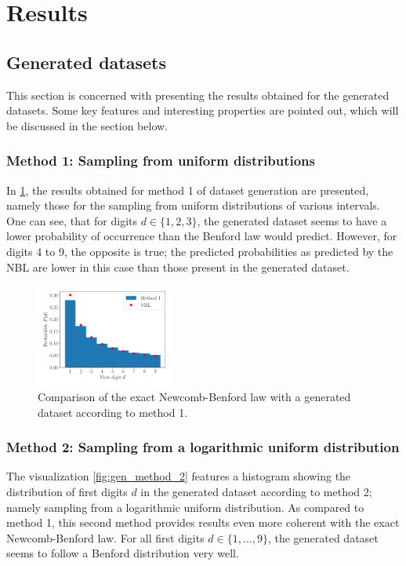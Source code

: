 \documentclass[a4paper,10pt, twocolumn]{article}
\begin{document}
\section{Results}
\subsection{Generated datasets}
This section is concerned with presenting the results obtained for the generated datasets. Some key features and interesting properties are pointed out, which will be discussed in the section below.

\subsubsection{Method 1: Sampling from uniform distributions}
In \cref{fig:gen_method_1}, the results obtained for method 1 of dataset generation are presented, namely those for the sampling from uniform distributions of various intervals. One can see, that for digits $d \in \{1,2,3\}$, the generated dataset seems to have a lower probability of occurrence than the Benford law would predict. However, for digits 4 to 9, the opposite is true; the predicted probabilities as predicted by the NBL are lower in this case than those present in the generated dataset.
\begin{figure}[h]
	\centering
	\includegraphics[width=0.4\textwidth]{figures/gen_method_1.pdf}
	\caption{Comparison of the exact Newcomb-Benford law with a generated dataset according to method 1.}
	\label{fig:gen_method_1}
\end{figure}


\subsubsection{Method 2: Sampling from a logarithmic uniform distribution}
The visualization \cref{fig:gen_method_2} features a histogram showing the distribution of first digits $d$ in the generated dataset according to method 2; namely sampling from a logarithmic uniform distribution. As compared to method 1, this second method provides results even more coherent with the exact Newcomb-Benford law. For all first digits $d \in \{1,\dots,9\}$, the generated dataset seems to follow a Benford distribution very well.
\end{document}
